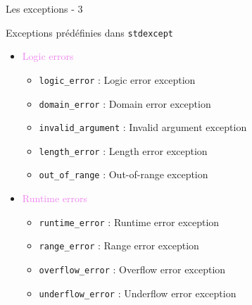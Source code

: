 \documentclass[handout,10pt]{beamer}
\begin{document}
\begin{frame}{Les exceptions - 3}
\tiny
\begin{block}{Exceptions prédéfinies}
dans \lstinline{stdexcept}
\begin{itemize}
\item \textcolor{violet}{Logic errors}
\begin{itemize}
\item \lstinline$logic_error$ : Logic error exception 
\item \lstinline$domain_error$ : Domain error exception
\item \lstinline$invalid_argument$ : Invalid argument exception
\item \lstinline$length_error$ : Length error exception
\item \lstinline$out_of_range$ : Out-of-range exception
\end{itemize}
\item \textcolor{violet}{Runtime errors}
\begin{itemize}
\item \lstinline$runtime_error$ : Runtime error exception
\item \lstinline$range_error$ : Range error exception
\item \lstinline$overflow_error$ : Overflow error exception
\item \lstinline$underflow_error$ : Underflow error exception
\end{itemize}
\end{itemize}
\end{block}
\end{frame}
\end{document}

